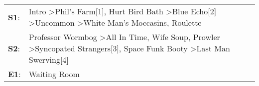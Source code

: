 \begin{supertabular}{p{0.03\textwidth}p{0.92\textwidth}}
 \textbf{S1}:  &           Intro\textsuperscript{} \textgreater \enspace Phil's Farm[1]\textsuperscript{}, \enspace Hurt Bird Bath\textsuperscript{} \textgreater \enspace Blue Echo[2]\textsuperscript{} \textgreater \enspace Uncommon\textsuperscript{} \textgreater \enspace White Man's Moccasins\textsuperscript{}, \enspace Roulette\textsuperscript{}  \enspace  \\
 \textbf{S2}:  &  Professor Wormbog\textsuperscript{} \textgreater \enspace All In Time\textsuperscript{}, \enspace Wife Soup\textsuperscript{}, \enspace Prowler\textsuperscript{} \textgreater \enspace Syncopated Strangers[3]\textsuperscript{}, \enspace Space Funk Booty\textsuperscript{} \textgreater \enspace Last Man Swerving[4]\textsuperscript{}  \enspace  \\
 \textbf{E1}:  &                                                                                                                                                                                                                                                                                                               Waiting Room\textsuperscript{}  \enspace  \\
\end{supertabular}
